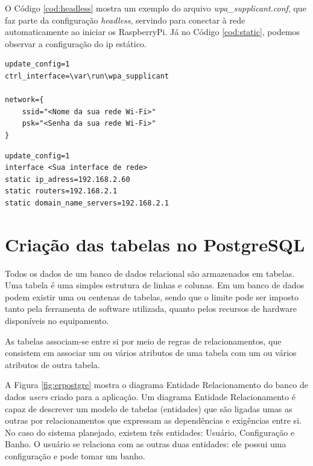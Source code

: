 O Código \ref{cod:headless} mostra um exemplo do arquivo \textit{wpa\_supplicant.conf}, que faz parte da configuração \textit{headless}, servindo para conectar à rede automaticamente ao iniciar os RaspberryPi. Já no Código \ref{cod:static}, podemos observar a configuração do ip estático.

\begin{lstlisting}[caption=Exemplo de configuração \textit{headless}, label=cod:headless]
update_config=1
ctrl_interface=\var\run\wpa_supplicant

network={
    ssid="<Nome da sua rede Wi-Fi>"
    psk="<Senha da sua rede Wi-Fi>"
}
\end{lstlisting}

\begin{lstlisting}[caption=Exemplo de configuração do IP estático, label=cod:static]
update_config=1
interface <Sua interface de rede>
static ip_adress=192.168.2.60
static routers=192.168.2.1
static domain_name_servers=192.168.2.1
\end{lstlisting}



\section{Criação das tabelas no PostgreSQL}

Todos os dados de um banco de dados relacional são armazenados em tabelas. Uma tabela é uma simples estrutura de linhas e colunas. Em um banco de dados podem existir uma ou centenas de tabelas, sendo que o limite pode ser imposto tanto pela ferramenta de software utilizada, quanto pelos recursos de hardware disponíveis no equipamento.

As tabelas associam-se entre si por meio de regras de relacionamentos, que consistem em associar um ou vários atributos de uma tabela com um ou vários atributos de outra tabela.

A Figura \ref{fig:erpostgre} mostra o diagrama Entidade Relacionamento do banco de dados \textit{users} criado para a aplicação. Um diagrama Entidade Relacionamento é capaz de descrever um modelo de tabelas (entidades) que são ligadas umas as outras por relacionamentos que expressam as dependências e exigências entre si. No caso do sistema planejado, existem três entidades: Usuário, Configuração e Banho. O usuário se relaciona com as outras duas entidades: ele possui uma configuração e pode tomar um banho.

